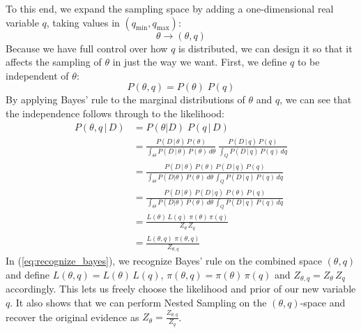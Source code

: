 \documentclass[12pt, a4paper]{report}
\begin{document}
To this end, we expand the sampling space by adding a one-dimensional real variable $q$, taking values in $(q_{\textrm{min}}, q_{\textrm{max}})$:
$$
\theta \rightarrow (\theta, q)
$$
Because we have full control over how $q$ is distributed, we can design it so that it affects the sampling of $\theta$ in just the way we want.
First, we define $q$ to be independent of $\theta$:
$$
P(\theta, q) = P(\theta) \; P(q)
$$
By applying Bayes' rule to the marginal distributions of $\theta$ and $q$, we can see that the independence follows through to the likelihood:
\begin{align}
    P(\theta, q \,|\, D) &= P(\theta | D) \; P(q \,|\, D) \nonumber\\
    &= \frac{P(D \,|\, \theta) \, P(\theta)}{\int_\Theta P(D \,|\, \theta) \, P(\theta) \, d\theta} \, \frac{P(D \,|\, q) \, P(q)}{\int_Q P(D \,|\, q) \, P(q) \, dq} \nonumber\\
    &= \frac{P(D \,|\, \theta) \, P(\theta) \, P(D \,|\, q) \, P(q)}{\int_\Theta P(D | \theta) \, P(\theta) \, d\theta \, \int_Q P(D \,|\, q) \, P(q) \, dq} \nonumber\\
    &= \frac{P(D \,|\, \theta) \, P(D \,|\, q) \; P(\theta) \, P(q)}{\int_\Theta P(D | \theta) \, P(\theta) \, d\theta \, \int_Q P(D \,|\, q) \, P(q) \, dq} \nonumber\\
    &= \frac{L(\theta) \, L(q) \; \pi(\theta) \, \pi(q)}{Z_\theta \, Z_q} \label{eq:recognize_bayes}\\
    &= \frac{L(\theta, q) \; \pi(\theta, q)}{Z_{\theta, q}} \nonumber
\end{align}
In (\ref{eq:recognize_bayes}), we recognize Bayes' rule on the combined space $(\theta, q)$ and define $L(\theta, q) = L(\theta) \, L(q)$, $\pi(\theta, q) = \pi(\theta) \, \pi(q)$ and $Z_{\theta, q} = Z_\theta \, Z_q$ accordingly.
This lets us freely choose the likelihood and prior of our new variable $q$.
It also shows that we can perform Nested Sampling on the $(\theta, q)$-space and recover the original evidence as $Z_\theta = \frac{Z_{\theta, q}}{Z_q}$.
\end{document}
